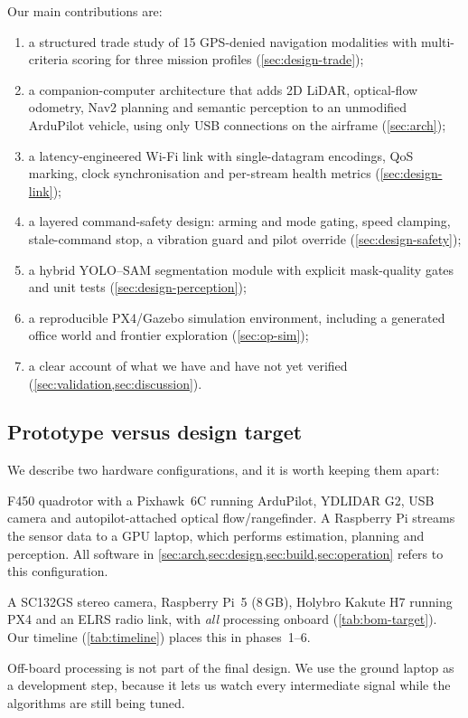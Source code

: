 Our main contributions are:
\begin{enumerate}[leftmargin=*,itemsep=1pt]
  \item a structured trade study of 15 GPS-denied navigation modalities with
    multi-criteria scoring for three mission profiles (\cref{sec:design-trade});
  \item a companion-computer architecture that adds 2D LiDAR, optical-flow odometry,
    Nav2 planning and semantic perception to an unmodified ArduPilot vehicle, using
    only USB connections on the airframe (\cref{sec:arch});
  \item a latency-engineered Wi-Fi link with single-datagram encodings, QoS marking,
    clock synchronisation and per-stream health metrics (\cref{sec:design-link});
  \item a layered command-safety design: arming and mode gating, speed clamping,
    stale-command stop, a vibration guard and pilot override (\cref{sec:design-safety});
  \item a hybrid YOLO--SAM segmentation module with explicit mask-quality gates and
    unit tests (\cref{sec:design-perception});
  \item a reproducible PX4/Gazebo simulation environment, including a generated office
    world and frontier exploration (\cref{sec:op-sim});
  \item a clear account of what we have and have not yet verified
    (\cref{sec:validation,sec:discussion}).
\end{enumerate}

\subsection{Prototype versus design target}
\label{sec:proto-vs-target}

We describe two hardware configurations, and it is worth keeping them apart:
\begin{description}[leftmargin=1em,itemsep=2pt]
  \item[Current prototype (implemented).] F450 quadrotor with a Pixhawk~6C running ArduPilot, YDLIDAR G2, USB
    camera and autopilot-attached optical flow/rangefinder. A Raspberry Pi streams the
    sensor data to a GPU laptop, which performs estimation, planning and perception.
    All software in \cref{sec:arch,sec:design,sec:build,sec:operation} refers to this
    configuration.
  \item[Design target (specified, not yet built).] A SC132GS stereo camera,
    Raspberry Pi~5 (8\,GB), Holybro Kakute H7 running PX4 and an ELRS radio link, with
    \emph{all} processing onboard (\cref{tab:bom-target}). Our timeline
    (\cref{tab:timeline}) places this in phases~1--6.
\end{description}
Off-board processing is not part of the final design. We use the ground laptop as a
development step, because it lets us watch every intermediate signal while the
algorithms are still being tuned.
